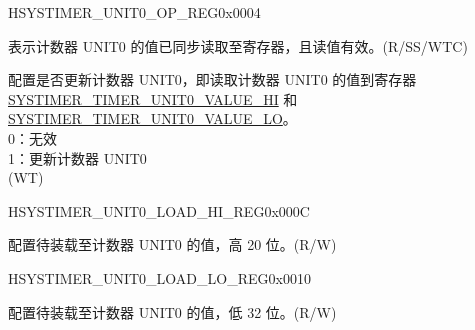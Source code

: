 \begin{register}{H}{SYSTIMER\_UNIT0\_OP\_REG}{0x0004}\label{regdesc:SYSTIMERUNIT0OPREG}
%
%
%
%
\regnewline%
\begin{regdesc}\begin{reglist}
\label{fielddesc:SYSTIMERTIMERUNIT0VALUEVALID}\item [SYSTIMER\_TIMER\_UNIT0\_VALUE\_VALID] 表示计数器 UNIT0 的值已同步读取至寄存器，且读值有效。(R/SS/WTC)
\label{fielddesc:SYSTIMERTIMERUNIT0UPDATE}\item [SYSTIMER\_TIMER\_UNIT0\_UPDATE] 配置是否更新计数器 UNIT0，即读取计数器 UNIT0 的值到寄存器 \hyperref[fielddesc:SYSTIMERTIMERUNIT0VALUEHI]{SYSTIMER\_TIMER\_UNIT0\_VALUE\_HI} 和 \hyperref[fielddesc:SYSTIMERTIMERUNIT0VALUELO]{SYSTIMER\_TIMER\_UNIT0\_VALUE\_LO}。\\
0：无效\\
1：更新计数器 UNIT0\\
(WT)
\end{reglist}\end{regdesc}
\end{register}


\begin{register}{H}{SYSTIMER\_UNIT0\_LOAD\_HI\_REG}{0x000C}\label{regdesc:SYSTIMERUNIT0LOADHIREG}
%
%
\regnewline%
\begin{regdesc}\begin{reglist}
\label{fielddesc:SYSTIMERTIMERUNIT0LOADHI}\item [SYSTIMER\_TIMER\_UNIT0\_LOAD\_HI] 配置待装载至计数器 UNIT0 的值，高 20 位。(R/W)
\end{reglist}\end{regdesc}
\end{register}


\begin{register}{H}{SYSTIMER\_UNIT0\_LOAD\_LO\_REG}{0x0010}\label{regdesc:SYSTIMERUNIT0LOADLOREG}
%
\regnewline%
\begin{regdesc}\begin{reglist}
\label{fielddesc:SYSTIMERTIMERUNIT0LOADLO}\item [SYSTIMER\_TIMER\_UNIT0\_LOAD\_LO] 配置待装载至计数器 UNIT0 的值，低 32 位。(R/W)
\end{reglist}\end{regdesc}
\end{register}


